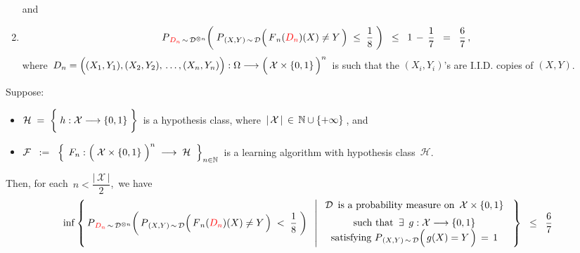 \begin{theorem}
\begin{enumerate}
\begin{equation*}
	\end{equation*}
	and
\item
	\begin{equation*}
	P_{\,{\color{red}D_{n}}\,\sim\,\mathcal{D}^{\otimes n}}\!\left(\;
		P_{\,(X,Y)\,\sim\,\mathcal{D}}\!\left(\,\overset{{\color{white}.}}{F}_{n}({\color{red}D_{n}})(X) \neq Y \,\right)
		\; \leq \;
			\dfrac{1}{8}
		\;\right)
	\;\; \leq \;\;
		1 \,-\, \dfrac{1}{7}
	\;\; = \;\;
		\dfrac{6}{7}\,,
	\end{equation*}
	where
	\,$D_{n} = \left((X_{1},Y_{1}),(X_{2},Y_{2}),\,\overset{{\color{white}\vert}}{\ldots}\,,(X_{n},Y_{n})\right)
		: \Omega \longrightarrow
		\left(\,\mathcal{X}\overset{{\color{white}.}}{\times}\{0,1\}\,\right)^{n}$\,
	is such that the
	$(X_{i},Y_{i})$'s are I.I.D. copies of $(X,Y)$.
\end{enumerate}
\end{theorem}


\vskip 1.0cm
\begin{corollary}
\mbox{}\vskip 0.1cm
\noindent
Suppose:
\begin{itemize}
\item
	$\mathcal{H} \; = \; \left\{\; h : \mathcal{X} \overset{{\color{white}\vert}}{\longrightarrow} \{0,1\}\;\right\}$\,
	is a hypothesis class, where \,$\vert\,\mathcal{X}\,\vert \,\in\, \mathbb{N}\cup\{+\infty\}$\,, and
\item
	$\mathcal{F}
	\;\; : = \;\;
		\left\{\;\,
			F_{n} : \left(\;\mathcal{X} \overset{{\color{white}.}}{\times} \{0,1\} \;\right)^{n}
			\; \longrightarrow \;\mathcal{H}
			\;\;\right\}_{n\in\N}$\,
	is a learning algorithm with hypothesis class \,$\mathcal{H}$.
\end{itemize}
Then, for each \,$n < \dfrac{\vert\,\mathcal{X}\,\vert}{2}$,\, we have
\begin{equation*}
\inf\left\{\,
	P_{\,{\color{red}D_{n}}\,\sim\,\mathcal{D}^{\otimes n}}\!\left(\,
		P_{\,(X,Y)\,\sim\,\mathcal{D}}\!\left(\,\overset{{\color{white}.}}{F}_{n}({\color{red}D_{n}})(X) \neq Y \,\right)
		\; < \;
			\dfrac{1}{8}
		\;\right)
	\;\;\left\vert\;
		\begin{array}{c}
		\textnormal{$\mathcal{D}$\, is a probability measure on \,$\mathcal{X} \times \{0,1\}$}
		\\
		\textnormal{such that \,$\overset{{\color{white}-}}{\exists}\;\, g : \mathcal{X} \longrightarrow \{0,1\}$}
		\\
		\textnormal{satisfying $P_{\,(X,Y)\,\sim\,\mathcal{D}}\!\left(\,g(X)\overset{{\color{white}-}}{=}Y\,\right) \,=\, 1$}
		\end{array}
	\right.\;\right\}
\;\; \leq \;\;
	\dfrac{6}{7}
\end{equation*}
\end{corollary}

